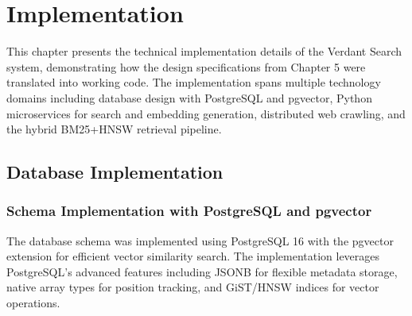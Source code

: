 \chapter{Implementation}

This chapter presents the technical implementation details of the Verdant Search system, demonstrating how the design specifications from Chapter 5 were translated into working code. The implementation spans multiple technology domains including database design with PostgreSQL and pgvector, Python microservices for search and embedding generation, distributed web crawling, and the hybrid BM25+HNSW retrieval pipeline.

\section{Database Implementation}

\subsection{Schema Implementation with PostgreSQL and pgvector}

The database schema was implemented using PostgreSQL 16 with the pgvector extension for efficient vector similarity search. The implementation leverages PostgreSQL's advanced features including JSONB for flexible metadata storage, native array types for position tracking, and GiST/HNSW indices for vector operations.

